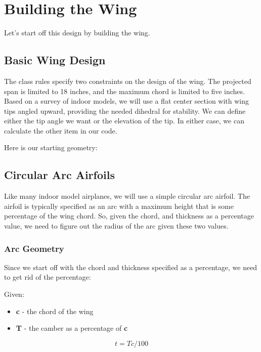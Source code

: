 \section{Building the Wing}

Let's start off this design by building the wing.

\subsection*{Basic Wing Design}

The class rules specify two constraints on the design of the wing. The projected
span is limited to 18 inches, and the maximum chord is limited to five inches.
Based on a survey of indoor models, we will use a flat center section with wing
tips angled upward, providing the needed dihedral for stability. We can define
either the tip angle we want or the elevation of the tip. In either case, we can
calculate the other item in our code. 

Here is our starting geometry:


\subsection{Circular Arc Airfoils}

Like many indoor model airplanes, we will use a simple circular arc airfoil.
The airfoil is typically specified as an arc with a maximum height that is some
percentage of the wing chord.  So, given the chord, and thickness as a
percentage value, we need to figure out the radius of the arc given these two
values.

\subsubsection{Arc Geometry}

Since we start off with the chord and thickness specified as a percentage, we
need to get rid of the percentage:

Given:

\begin{itemize}
  \item{{\bf c} - the chord of the wing}
  \item{{\bf T} - the camber as a percentage of {\bf c}}
\end{itemize}

\begin{equation}
    t =  T c / 100
\end{equation}

